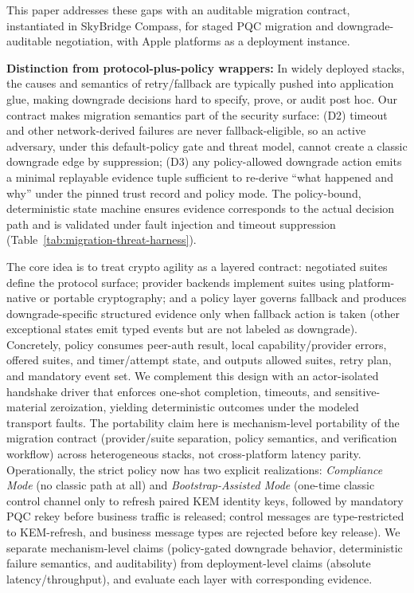 \documentclass[10pt,journal,compsoc]{IEEEtran}
\begin{document}
This paper addresses these gaps with an auditable migration contract,
instantiated in SkyBridge Compass, for staged PQC migration and
downgrade-auditable negotiation, with Apple platforms as a deployment
instance.

\textbf{Distinction from protocol-plus-policy wrappers:} In widely
deployed stacks, the causes and semantics of retry/fallback are
typically pushed into application glue, making downgrade decisions hard
to specify, prove, or audit post hoc. Our contract makes migration
semantics part of the security surface: (D2) timeout and other
network-derived failures are never fallback-eligible, so an active
adversary, under this default-policy gate and threat model, cannot
create a classic downgrade edge by suppression; (D3)
any policy-allowed downgrade action emits a minimal replayable evidence
tuple sufficient to re-derive ``what happened and why'' under the pinned
trust record and policy mode. The policy-bound, deterministic state
machine ensures evidence corresponds to the actual decision path and is
validated under fault injection and timeout suppression
(Table~\ref{tab:migration-threat-harness}).

The core
idea is to treat crypto agility as a layered
contract: negotiated suites define the protocol surface; provider
backends implement suites using platform-native or portable
cryptography; and a policy layer governs fallback and produces
downgrade-specific structured evidence only when fallback action is
taken (other exceptional states emit typed events but are not labeled
as downgrade). Concretely, policy consumes peer-auth result, local
capability/provider errors, offered suites, and timer/attempt state, and
outputs allowed suites, retry plan, and mandatory event set. We
complement
this design with an actor-isolated handshake driver that enforces
one-shot completion, timeouts, and sensitive-material zeroization,
yielding deterministic outcomes under the modeled transport faults.
The portability claim here is mechanism-level portability of the
migration contract (provider/suite separation, policy semantics, and
verification workflow) across heterogeneous stacks, not cross-platform
latency parity.
Operationally, the strict policy now has two explicit realizations:
\emph{Compliance Mode} (no classic path at all) and
\emph{Bootstrap-Assisted Mode} (one-time classic control channel only to
refresh paired KEM identity keys, followed by mandatory PQC rekey before
business traffic is released; control messages are type-restricted to
KEM-refresh, and business message types are rejected before key
release).
We separate mechanism-level claims (policy-gated downgrade behavior,
deterministic failure semantics, and auditability) from deployment-level
claims (absolute latency/throughput), and evaluate each layer with
corresponding evidence.
\end{document}
